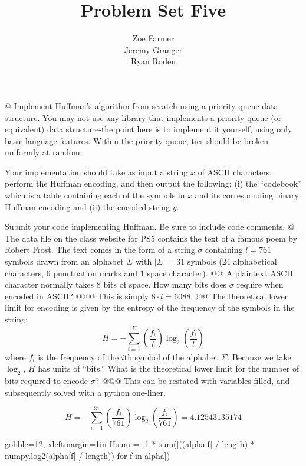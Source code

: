 \documentclass[10pt]{article}
\title{Problem Set Five}
\author{Zoe Farmer\\Jeremy Granger\\Ryan Roden}
\begin{document}
\maketitle

\begin{easylist}[enumerate]
    @ Implement Huffman's algorithm from scratch using a priority queue data structure. You may not use any library that
    implements a priority queue (or equivalent) data structure-the point here is to implement it yourself, using only
    basic language features. Within the priority queue, ties should be broken uniformly at random.\newline

    Your implementation should take as input a string $x$ of ASCII characters, perform the Huffman encoding, and then
    output the following: (i) the ``codebook'' which is a table containing each of the symbols in $x$ and its corresponding
    binary Huffman encoding and (ii) the encoded string $y$.\newline

    Submit your code implementing Huffman. Be sure to include code comments.
    @ The data file on the class website for PS5 contains the text of a famous poem by Robert Frost. The text comes in
    the form of a string $\sigma$ containing $l = 761$ symbols drawn from an alphabet $\Sigma$ with $|\Sigma| = 31$
    symbols (24 alphabetical characters, 6 punctuation marks and 1 space character).
    @@ A plaintext ASCII character normally takes 8 bits of space. How many bits does $\sigma$ require when encoded in
    ASCII?
    @@@ This is simply $ 8 \cdot l= 6088$.
    @@ The theoretical lower limit for encoding is given by the entropy of the frequency of the symbols in the string:
        \[ H = - \sum^{|\Sigma|}_{i=1} \left( \frac{f_i}{l} \right) \log_2 \left( \frac{f_i}{l} \right) \]
        where $f_i$ is the frequency of the $i$th symbol of the alphabet $\Sigma$. Because we take $\log_2$, $H$ has
        units of ``bits.'' What is the theoretical lower limit for the number of bits required to encode $\sigma$?
    @@@ This can be restated with variables filled, and subsequently solved with a python one-liner.

        \[
            H = - \sum^{31}_{i=1} \left( \frac{f_i}{761} \right) \log_2 \left( \frac{f_i}{761} \right) = 4.12543135174
        \]

        \begin{pythoncode*}{gobble=12, xleftmargin=1in}
            Hsum = -1 * sum([((alpha[f] / length) *
                            numpy.log2(alpha[f] / length))
                            for f in alpha])
        \end{pythoncode*}


\end{easylist}
\end{document}
